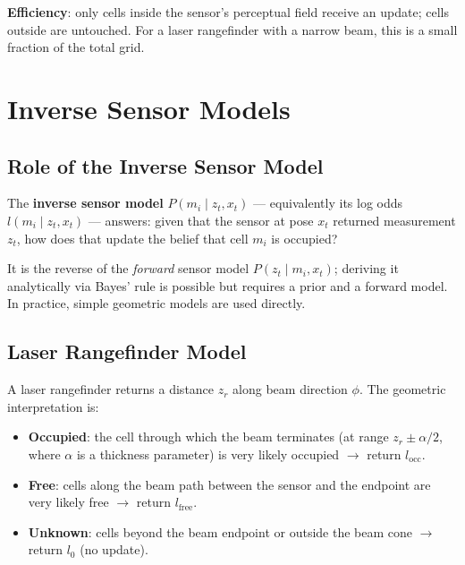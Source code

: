 \documentclass[11pt,a4paper]{article}
\theoremstyle{definition}
\theoremstyle{plain}
\theoremstyle{remark}
\begin{document}
\textbf{Efficiency}: only cells inside the sensor's perceptual field receive an update; cells outside are untouched. For a laser rangefinder with a narrow beam, this is a small fraction of the total grid.

\section{Inverse Sensor Models}

\subsection{Role of the Inverse Sensor Model}

The \textbf{inverse sensor model} $P(m_i \mid z_t, x_t)$ --- equivalently its log odds $l(m_i \mid z_t, x_t)$ --- answers: given that the sensor at pose $x_t$ returned measurement $z_t$, how does that update the belief that cell $m_i$ is occupied?

It is the reverse of the \emph{forward} sensor model $P(z_t \mid m_i, x_t)$; deriving it analytically via Bayes' rule is possible but requires a prior and a forward model. In practice, simple geometric models are used directly.

\subsection{Laser Rangefinder Model}

A laser rangefinder returns a distance $z_r$ along beam direction $\phi$. The geometric interpretation is:

\begin{itemize}
    \item \textbf{Occupied}: the cell through which the beam terminates (at range $z_r \pm \alpha/2$, where $\alpha$ is a thickness parameter) is very likely occupied $\rightarrow$ return $l_\mathrm{occ}$.
    \item \textbf{Free}: cells along the beam path between the sensor and the endpoint are very likely free $\rightarrow$ return $l_\mathrm{free}$.
    \item \textbf{Unknown}: cells beyond the beam endpoint or outside the beam cone $\rightarrow$ return $l_0$ (no update).
\end{itemize}
\end{document}
